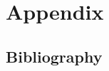 \captionsetup[figure]{list=no}

\section{Appendix}

\subsection{Bibliography}



\listoftables

\listoffigures